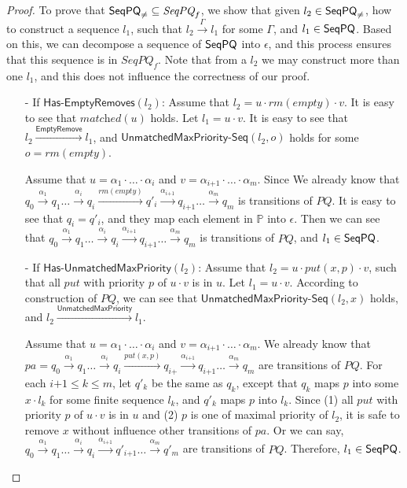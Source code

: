 \begin {proof}
To prove that $\mathsf{SeqPQ}_{\neq} \subseteq \textit{SeqPQ}_f$, we show that given $l_2 \in \mathsf{SeqPQ}_{\neq}$, how to construct a sequence $l_1$, such that $l_2 \xrightarrow{\Gamma} l_1$ for some $\Gamma$, and $l_1 \in \mathsf{SeqPQ}$. Based on this, we can decompose a sequence of $\mathsf{SeqPQ}$ into $\epsilon$, and this process ensures that this sequence is in $\textit{SeqPQ}_f$. Note that from a $l_2$ we may construct more than one $l_1$, and this does not influence the correctness of our proof.

\begin{itemize}
\setlength{\itemsep}{0.5pt}
\item[-] If $\mathsf{Has\text{-}EmptyRemoves}(l_2)$: Assume that $l_2 = u \cdot \textit{rm}(\textit{empty}) \cdot v$. It is easy to see that $\textit{matched}(u)$ holds. Let $l_1 = u \cdot v$. It is easy to see that $l_2 \xrightarrow{\mathsf{EmptyRemove}} l_1$, and $\mathsf{UnmatchedMaxPriority\text{-}Seq}(l_2,o)$ holds for some $o=\textit{rm}(\textit{empty})$.

    Assume that $u = \alpha_1 \cdot \ldots \cdot \alpha_i$ and $v = \alpha_{\textit{i+1}} \cdot \ldots \cdot \alpha_m$. Since We already know that $q_0 \xrightarrow{\alpha_1} q_1 \ldots \xrightarrow{\alpha_i} q_i \xrightarrow{\textit{rm}(\textit{empty})} q'_i \xrightarrow{\alpha_{\textit{i+1}}} q_{\textit{i+1}} \ldots  \xrightarrow{\alpha_m} q_m$ is transitions of $\textit{PQ}$. It is easy to see that $q_i = q'_i$, and they map each element in $\mathbb{P}$ into $\epsilon$. Then we can see that $q_0 \xrightarrow{\alpha_1} q_1 \ldots \xrightarrow{\alpha_i} q_i \xrightarrow{\alpha_{\textit{i+1}}} q_{\textit{i+1}} \ldots  \xrightarrow{\alpha_m} q_m$ is transitions of $\textit{PQ}$, and $l_1 \in \mathsf{SeqPQ}$.

\item[-] If $\mathsf{Has\text{-}UnmatchedMaxPriority}(l_2)$: Assume that $l_2 = u \cdot \textit{put}(x,p) \cdot v$, such that all $\textit{put}$ with priority $p$ of $u \cdot v$ is in $u$. Let $l_1 = u \cdot v$. According to construction of $\textit{PQ}$, we can see that $\mathsf{UnmatchedMaxPriority\text{-}Seq}(l_2,x)$ holds, and $l_2 \xrightarrow{\mathsf{UnmatchedMaxPriority}} l_1$.

    Assume that $u = \alpha_1 \cdot \ldots \cdot \alpha_i$ and $v = \alpha_{\textit{i+1}} \cdot \ldots \cdot \alpha_m$. We already know that $\textit{pa} = q_0 \xrightarrow{\alpha_1} q_1 \ldots \xrightarrow{\alpha_i} q_i \xrightarrow{\textit{put}(x,p)} q_{\textit{i+}} \xrightarrow{\alpha_{\textit{i+1}}} q_{\textit{i+1}} \ldots \xrightarrow{\alpha_m} q_m$ are transitions of $\textit{PQ}$. For each $\textit{i+1} \leq k \leq m$, let $q'_k$ be the same as $q_k$, except that $q_k$ maps $p$ into some $x \cdot l_k$ for some finite sequence $l_k$, and $q'_k$ maps $p$ into $l_k$. Since (1) all $\textit{put}$ with priority $p$ of $u \cdot v$ is in $u$ and (2) $p$ is one of maximal priority of $l_2$, it is safe to remove $x$ without influence other transitions of $\textit{pa}$. Or we can say, $q_0 \xrightarrow{\alpha_1} q_1 \ldots \xrightarrow{\alpha_i} q_i \xrightarrow{\alpha_{\textit{i+1}}} q'_{\textit{i+1}} \ldots \xrightarrow{\alpha_m} q'_m$ are transitions of $\textit{PQ}$. Therefore, $l_1 \in \mathsf{SeqPQ}$.



\end{itemize}
\end{proof}
